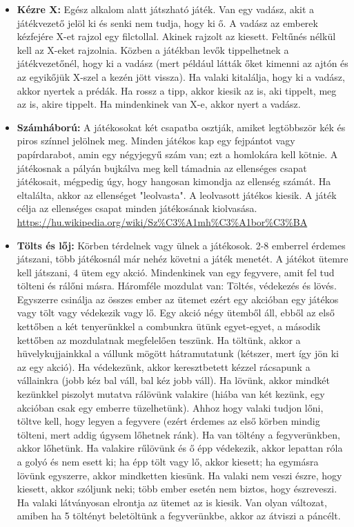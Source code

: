 \documentclass[a4paper, 12pt, twoside, openright]{article}
\begin{document}
\begin{itemize}
\item \textbf{Kézre X:} Egész alkalom alatt játszható játék. Van egy vadász, akit a játékvezető jelöl ki és senki nem tudja, hogy ki ő. A vadász az emberek kézfejére X-et rajzol egy filctollal. Akinek rajzolt az kiesett. Feltűnés nélkül kell az X-eket rajzolnia. Közben a játékban levők tippelhetnek a játékvezetőnél, hogy ki a vadász (mert például látták őket kimenni az ajtón és az egyikőjük X-szel a kezén jött vissza). Ha valaki kitalálja, hogy ki a vadász, akkor nyertek a prédák. Ha rossz a tipp, akkor kiesik az is, aki tippelt, meg az is, akire tippelt. Ha mindenkinek van X-e, akkor nyert a vadász.

\item \textbf{Számháború:} A játékosokat két csapatba osztják, amiket legtöbbször kék és piros színnel jelölnek meg. Minden játékos kap egy fejpántot vagy papírdarabot, amin egy négyjegyű szám van; ezt a homlokára kell kötnie. A játékosnak a pályán bujkálva meg kell támadnia az ellenséges csapat játékosait, mégpedig úgy, hogy hangosan kimondja az ellenség számát. Ha eltalálta, akkor az ellenséget "leolvasta". A leolvasott játékos kiesik. A játék célja az ellenséges csapat minden játékosának kiolvasása.\\
\url{https://hu.wikipedia.org/wiki/Sz%C3%A1mh%C3%A1bor%C3%BA}

\item \textbf{Tölts és lőj:} Körben térdelnek vagy ülnek a játékosok. 2-8 emberrel érdemes játszani, több játékosnál már nehéz követni a játék menetét. A játékot ütemre kell játszani, 4 ütem egy akció. Mindenkinek van egy fegyvere, amit fel tud tölteni és rálőni másra. Háromféle mozdulat van: Töltés, védekezés és lövés. Egyszerre csinálja az összes ember az ütemet ezért egy akcióban egy játékos vagy tölt vagy védekezik vagy lő. Egy akció négy ütemből áll, ebből az első kettőben a két tenyerünkkel a combunkra ütünk egyet-egyet, a második kettőben az mozdulatnak megfelelően teszünk. Ha töltünk, akkor a hüvelykujjainkkal a vállunk mögött hátramutatunk (kétszer, mert így jön ki az egy akció). Ha védekezünk, akkor keresztbetett kézzel rácsapunk a vállainkra (jobb kéz bal váll, bal kéz jobb váll). Ha lövünk, akkor mindkét kezünkkel piszolyt mutatva rálövünk valakire (hiába van két kezünk, egy akcióban csak egy emberre tüzelhetünk). Ahhoz hogy valaki tudjon lőni, töltve kell, hogy legyen a fegyvere (ezért érdemes az első körben mindig tölteni, mert addig úgysem lőhetnek ránk). Ha van töltény a fegyverünkben, akkor lőhetünk. Ha valakire rűlövünk és ő épp védekezik, akkor lepattan róla a golyó és nem esett ki; ha épp tölt vagy lő, akkor kiesett; ha egymásra lövünk egyszerre, akkor mindketten kiesünk. Ha valaki nem veszi észre, hogy kiesett, akkor szóljunk neki; több ember esetén nem biztos, hogy észreveszi. Ha valaki látványosan elrontja az ütemet az is kiesik. Van olyan változat, amiben ha 5 töltényt beletöltünk a fegyverünkbe, akkor az átviszi a páncélt.


\end{itemize}
\end{document}
